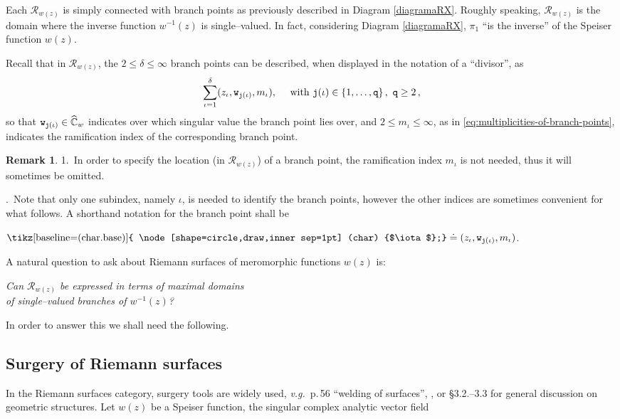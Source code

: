 \documentclass[final,3p,times]{elsarticle}
\newcommand{\CW}{\ensuremath{{\widehat{\mathbb C}}}}
\newcommand{\R}{\ensuremath{{\mathcal R}}}
\newcommand{\circled}[1]{ \text{\tikz[baseline=(char.base)]{
    \node[shape=circle,draw,inner sep=1pt] (char) {$#1$};}} }
\theoremstyle{definition}
\newtheorem{remark}[theorem]{Remark}
\begin{document}
\noindent
Each  $\R_{w(z)}$ is simply connected 
with branch points as previously 
described in Diagram \eqref{diagramaRX}.
Roughly speaking, $\R_{w(z)}$ is the domain where the inverse function 
$w^{-1}(z)$ is single--valued.
In fact, considering Diagram \eqref{diagramaRX}, 
$\pi_1$ ``is the inverse'' of the Speiser function $w(z)$.

Recall that in $\R_{w(z)}$, the $2\leq\delta\leq\infty$ branch points can be described, when 
displayed in the notation of a ``divisor'', as
\begin{equation}
\sum_{\iota=1}^{\delta} ( z_\iota, {\tt w}_{{\tt j}(\iota)}, m_{\iota} ),
\quad
\text{ with } {\tt j}(\iota)\in\{1,\ldots,{\tt q} \}\, ,
\ {\tt q} \geq 2 \, , 
\end{equation}
so that ${\tt w}_{{\tt j}(\iota)}\in\CW_w$ indicates over which 
singular value the branch point lies over, and $2\leq m_{\iota} \leq \infty$, 
as in \eqref{eq:multiplicities-of-branch-points}, 
indicates the ramification index of the corresponding branch point.

\begin{remark}
\label{rem:ramindex-subindex}
1.\ In order to specify the location (in $\R_{w(z)}$) of a branch point, 
the ramification index $m_{\iota}$ is not needed, 
thus it will sometimes be omitted.

.\ 
Note that only one subindex, namely $\iota$, is needed to identify the branch points, however the
other indices are sometimes convenient for what follows. 
A shorthand notation for the branch point shall be 

\centerline{
$\circled{\iota} \doteq ( z_\iota, {\tt w}_{{\tt j}(\iota)}, m_{\iota} )$.}
\end{remark}

A natural question to ask about Riemann surfaces of meromorphic functions $w(z)$ is:

\begin{center}
{\it
Can $\R_{w(z)}$ be expressed in terms of maximal domains\\ 
of single--valued branches of $w^{-1}(z)$?
}
\end{center}

\noindent
In order to answer this we shall need the following.
\subsection{Surgery of Riemann surfaces}
\label{sec:Gluing Riemann surfaces}
In the Riemann surfaces
category, surgery tools are widely used, {\it v.g.} 
\cite{Strebel}\,p.\,56 ``welding of surfaces'', 
\cite{MR}, 
or \cite{Thurston} \S 3.2.--3.3 for general 
discussion on geometric structures.
Let $w(z)$ be a Speiser function, 
the singular complex analytic vector field 
\end{document}

